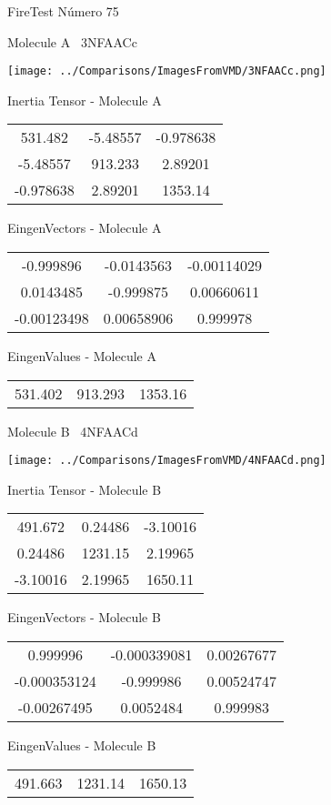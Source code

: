 \vtab[-3cm]
\begin{center}
{\large FireTest \tab Número 75}
\end{center}
\begin{multicols}{2}
\begin{center}

Molecule A \
3NFAACc

\texttt{[image: ../Comparisons/ImagesFromVMD/3NFAACc.png]}

Inertia Tensor - Molecule A \\
\begin{tabular}{|c c c|}
531.482	 & 	-5.48557	 & 	-0.978638	 \\
-5.48557	 & 	913.233	 & 	2.89201	 \\
-0.978638	 & 	2.89201	 & 	1353.14
\end{tabular}

\vtab
 EingenVectors - Molecule A     \\
\begin{tabular}{|c c c|}
-0.999896	 & 	-0.0143563	 & 	-0.00114029	 \\
0.0143485	 & 	-0.999875	 & 	0.00660611	 \\
-0.00123498	 & 	0.00658906	 & 	0.999978
\end{tabular}

\vtab
 EingenValues - Molecule A     \\
\begin{tabular}{|c c c|}
531.402	 & 	913.293	 & 	1353.16	 \\
\end{tabular}
\columnbreak

Molecule B \
4NFAACd

\texttt{[image: ../Comparisons/ImagesFromVMD/4NFAACd.png]}

Inertia Tensor - Molecule B \\
\begin{tabular}{|c c c|}
491.672	 & 	0.24486	 & 	-3.10016	 \\
0.24486	 & 	1231.15	 & 	2.19965	 \\
-3.10016	 & 	2.19965	 & 	1650.11
\end{tabular}

\vtab
 EingenVectors - Molecule B     \\
\begin{tabular}{|c c c|}
0.999996	 & 	-0.000339081	 & 	0.00267677	 \\
-0.000353124	 & 	-0.999986	 & 	0.00524747	 \\
-0.00267495	 & 	0.0052484	 & 	0.999983
\end{tabular}

\vtab
 EingenValues - Molecule B     \\
\begin{tabular}{|c c c|}
491.663	 & 	1231.14	 & 	1650.13	 \\
\end{tabular}

\end{center}
\end{multicols}

